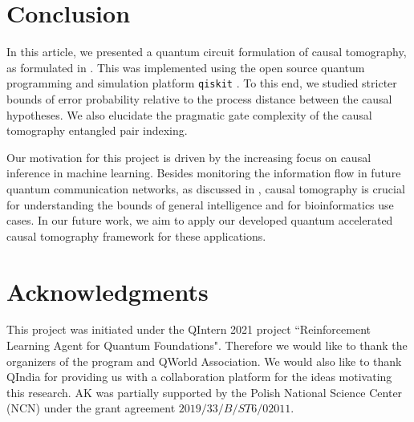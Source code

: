\section{Conclusion} \label{sec:conclusion}

In this article, we presented a quantum circuit formulation of causal tomography, as formulated in \cite{chiribella2019quantum}.
This was implemented using the open source quantum programming and simulation platform \texttt{qiskit} .
To this end, we studied stricter bounds of error probability relative to the process distance between the causal hypotheses.
We also elucidate the pragmatic gate complexity of the causal tomography entangled pair indexing.

Our motivation for this project is driven by the increasing focus on causal inference in machine learning.
Besides monitoring the information flow in future quantum communication networks, as discussed in \cite{chiribella2019quantum}, causal tomography is crucial for understanding the bounds of general intelligence and for bioinformatics use cases.
In our future work, we aim to apply our developed quantum accelerated causal tomography framework for these applications.

\section*{Acknowledgments}

This project was initiated under the QIntern 2021 project ``Reinforcement Learning Agent for Quantum Foundations".
Therefore we would like to thank the organizers of the program and QWorld Association. 
We would also like to thank QIndia for providing us with a collaboration platform for the ideas motivating this research.
AK was partially supported by the Polish National Science Center (NCN) under the grant agreement $2019/33/B/ST6/02011$.
